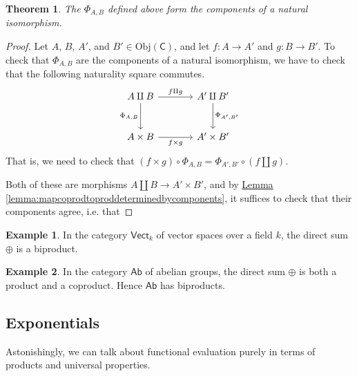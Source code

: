 \documentclass[a4paper,10pt]{scrreprt}
\newcommand{\Obj}{\mathrm{Obj}}
\theoremstyle{definition}
\newtheorem{example}{Example}[section]
\theoremstyle{plain}
\newtheorem{theorem}{Theorem}[section]
\theoremstyle{remark}
\begin{document}
\begin{theorem}
  The $\Phi_{A, B}$ defined above form the components of a natural isomorphism.
\end{theorem}
\begin{proof}
  Let $A$, $B$, $A'$, and $B' \in \Obj(\mathsf{C})$, and let $f\colon A \to A'$ and $g\colon B \to B'$. To check that $\Phi_{A, B}$ are the components of a natural isomorphism, we have to check that the following naturality square commutes.
  \begin{equation*}
    \begin{tikzcd}[column sep=large, row sep=large]
      A \amalg B
      \arrow[r, "f \amalg g"]
      \arrow[d, swap, "{\Phi_{A, B}}"]
      & A' \amalg B'
      \arrow[d, "{\Phi_{A', B'}}"]
      \\
      A \times B
      \arrow[r, swap, "f \times g"]
      & A' \times B'
    \end{tikzcd}
  \end{equation*}
  That is, we need to check that $(f \times g) \circ \Phi_{A, B} = \Phi_{A', B'} \circ (f \amalg g)$.

  Both of these are morphisms $A \amalg B \to A' \times B'$, and by \hyperref[lemma:mapcoprodtoproddeterminedbycomponents]{Lemma \ref*{lemma:mapcoprodtoproddeterminedbycomponents}}, it suffices to check that their components agree, i.e. that 
\end{proof}


\begin{example}
  In the category $\mathsf{Vect}_{k}$ of vector spaces over a field $k$, the direct sum $\oplus$ is a biproduct.
\end{example}

\begin{example}
  In the category $\mathsf{Ab}$ of abelian groups, the direct sum $\oplus$ is both a product and a coproduct. Hence $\mathsf{Ab}$ has biproducts. 
\end{example} 

\subsection{Exponentials}
Astonishingly, we can talk about functional evaluation purely in terms of products and universal properties.
\end{document}
